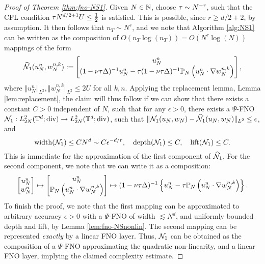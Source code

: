 \documentclass[reqno,a4paper]{amsart}
\begin{document}
\begin{proof}[Proof of Theorem \ref{thm:fno-NS1}]
Given $N\in \mathbb{N}$, choose ${\tau} \sim N^{-r}$, such that the CFL condition ${\tau} N^{d/2+1} U \le \frac12$ is satisfied. This is possible, since $r \ge d/2+2$, by assumption. It then follows that $n_T \sim N^r$, and we note that Algorithm \ref{alg:NS1} can be written as the composition of $O(n_T \log(n_T)) = O(N^r \log(N))$ mappings of the form 
\[
\widehat{\mathcal{N}}_1(u_N^n,w_N^{n,k})
:=
\begin{bmatrix}
u_N^n \\
(1-\nu{\tau} \Delta)^{-1} u_N^n
-
{\tau} (1-\nu {\tau} \Delta)^{-1} \mathbb{P}_N\left(u^n_N \cdot \nabla w^{n,k}_N\right)
\end{bmatrix},
\]
where $\Vert u_N^n \Vert_{L^2}, \Vert w^{n,k}_N \Vert_{L^2} \le 2U$ for all $k,n$.
Applying the replacement lemma, Lemma \ref{lem:replacement}, the claim will thus follow if we can show that there exists a constant $C>0$ independent of $N$, such that for any $\epsilon > 0$, there exists a $\Psi$-FNO $\mathcal{N}_1: L^2_{2N}(\mathbb{T}^d;{\mathrm{div}}) \to L^2_{2N}(\mathbb{T}^d;{\mathrm{div}})$, such that $\Vert \mathcal{N}_1(u_N,w_N) - \widehat{\mathcal{N}}_1(u_N,w_N) \Vert_{L^2} \le \epsilon$, and 
\[
\mathrm{width}(\mathcal{N}_1) \le C N^d \sim C \epsilon^{-d/r}, 
\quad
\mathrm{depth}(\mathcal{N}_1) \le C,
\quad
\mathrm{lift}(\mathcal{N}_1) \le C.
\]
This is immediate for the approximation of the first component of $\widehat{\mathcal{N}}_1$. For the second component, we note that we can write it as a composition:
\[
\begin{bmatrix}
u_N^n \\
w_N^n
\end{bmatrix}
\mapsto 
\begin{bmatrix}
u_N^n \\
\mathbb{P}_N\left(u^n_N \cdot \nabla w^{n,k}_N\right)
\end{bmatrix}
\mapsto 
(1-\nu{\tau} \Delta)^{-1} 
\left\{
u_N^n
-
{\tau} \mathbb{P}_N\left(u^n_N \cdot \nabla w^{n,k}_N\right)
\right\}.
\]
To finish the proof, we note that the first mapping can be approximated to arbitrary accuracy $\epsilon>0$ with a $\Psi$-FNO of width $\lesssim N^d$, and uniformly bounded depth and lift, by Lemma \ref{lem:fno-NSnonlin}. The second mapping can be represented \emph{exactly} by a linear FNO layer. Thus, $\mathcal{N}_1$ can be obtained as the composition of a $\Psi$-FNO approximating the quadratic non-linearity, and a linear FNO layer, implying the claimed complexity estimate.
\end{proof}
\end{document}
